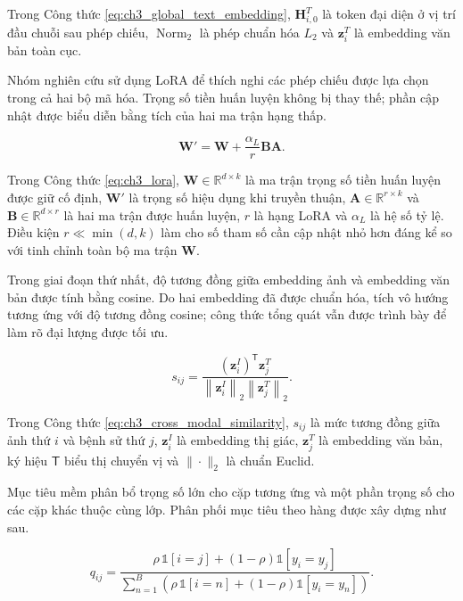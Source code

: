 Trong Công thức \ref{eq:ch3_global_text_embedding}, $\boldsymbol{H}_{i,0}^{T}$ là token đại diện ở vị trí đầu chuỗi sau phép chiếu, $\operatorname{Norm}_{2}$ là phép chuẩn hóa $L_2$ và $\boldsymbol{z}_{i}^{T}$ là embedding văn bản toàn cục.

Nhóm nghiên cứu sử dụng LoRA \cite{Hu2022LoRA} để thích nghi các phép chiếu được lựa chọn trong cả hai bộ mã hóa. Trọng số tiền huấn luyện không bị thay thế; phần cập nhật được biểu diễn bằng tích của hai ma trận hạng thấp.

\begin{equation}\boldsymbol{W}'=\boldsymbol{W}+\frac{\alpha_{L}}{r}\boldsymbol{B}\boldsymbol{A}.\label{eq:ch3_lora}\end{equation}

Trong Công thức \ref{eq:ch3_lora}, $\boldsymbol{W}\in\mathbb{R}^{d\times k}$ là ma trận trọng số tiền huấn luyện được giữ cố định, $\boldsymbol{W}'$ là trọng số hiệu dụng khi truyền thuận, $\boldsymbol{A}\in\mathbb{R}^{r\times k}$ và $\boldsymbol{B}\in\mathbb{R}^{d\times r}$ là hai ma trận được huấn luyện, $r$ là hạng LoRA và $\alpha_{L}$ là hệ số tỷ lệ. Điều kiện $r\ll\min(d,k)$ làm cho số tham số cần cập nhật nhỏ hơn đáng kể so với tinh chỉnh toàn bộ ma trận $\boldsymbol{W}$.

Trong giai đoạn thứ nhất, độ tương đồng giữa embedding ảnh và embedding văn bản được tính bằng cosine. Do hai embedding đã được chuẩn hóa, tích vô hướng tương ứng với độ tương đồng cosine; công thức tổng quát vẫn được trình bày để làm rõ đại lượng được tối ưu.

\begin{equation}s_{ij}=\frac{\left(\boldsymbol{z}_{i}^{I}\right)^{\mathsf{T}}\boldsymbol{z}_{j}^{T}}{\left\|\boldsymbol{z}_{i}^{I}\right\|_{2}\left\|\boldsymbol{z}_{j}^{T}\right\|_{2}}.\label{eq:ch3_cross_modal_similarity}\end{equation}

Trong Công thức \ref{eq:ch3_cross_modal_similarity}, $s_{ij}$ là mức tương đồng giữa ảnh thứ $i$ và bệnh sử thứ $j$, $\boldsymbol{z}_{i}^{I}$ là embedding thị giác, $\boldsymbol{z}_{j}^{T}$ là embedding văn bản, ký hiệu $\mathsf{T}$ biểu thị chuyển vị và $\|\cdot\|_{2}$ là chuẩn Euclid.

Mục tiêu mềm phân bổ trọng số lớn cho cặp tương ứng và một phần trọng số cho các cặp khác thuộc cùng lớp. Phân phối mục tiêu theo hàng được xây dựng như sau.

\begin{equation}q_{ij}=\frac{\rho\,\mathbb{1}\left[i=j\right]+\left(1-\rho\right)\mathbb{1}\left[y_i=y_j\right]}{\sum_{n=1}^{B}\left(\rho\,\mathbb{1}\left[i=n\right]+\left(1-\rho\right)\mathbb{1}\left[y_i=y_n\right]\right)}.\label{eq:ch3_semantic_target}\end{equation}


